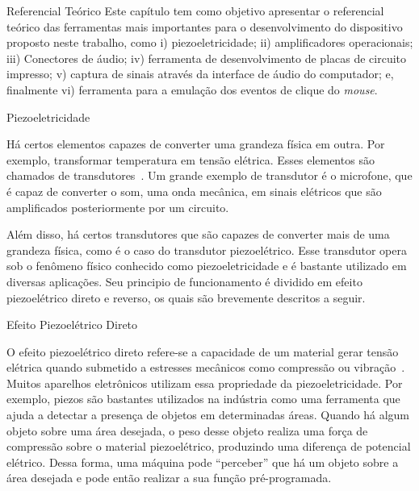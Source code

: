 \begin{chapter}{Referencial Teórico}
Este capítulo tem como objetivo apresentar o referencial teórico das ferramentas
mais importantes para o desenvolvimento do dispositivo proposto neste trabalho,
como i) piezoeletricidade; ii) amplificadores operacionais; iii) Conectores de
áudio; iv) ferramenta de desenvolvimento de placas de circuito impresso; v)
captura de sinais através da interface de áudio do computador; e, finalmente vi)
ferramenta para a emulação dos eventos de clique do \textit{mouse}.

\begin{section}{Piezoeletricidade}

Há certos elementos capazes de converter uma grandeza física em outra. Por
exemplo, transformar temperatura em tensão elétrica. Esses elementos são
chamados de transdutores~\cite{william}. Um grande exemplo de transdutor é o
microfone, que é capaz de converter o som, uma onda mecânica, em sinais
elétricos que são amplificados posteriormente por um circuito. %

Além disso, há certos transdutores que são capazes de converter mais de uma
grandeza física, como é o caso do transdutor piezoelétrico. Esse transdutor
opera sob o fenômeno físico conhecido como piezoeletricidade e é bastante
utilizado em diversas aplicações. Seu principio de funcionamento é dividido em
efeito piezoelétrico direto e reverso, os quais são brevemente descritos a
seguir.
  
\begin{subsection}{Efeito Piezoelétrico Direto}

O efeito piezoelétrico direto refere-se a capacidade de um material gerar tensão
elétrica quando submetido a estresses mecânicos como compressão ou
vibração~\cite{jaffe2012piezoelectric}. Muitos aparelhos eletrônicos utilizam
essa propriedade da piezoeletricidade. Por exemplo, piezos são bastantes
utilizados na indústria como uma ferramenta que ajuda a detectar a presença de
objetos em determinadas áreas. Quando há algum objeto sobre uma área desejada,
o peso desse objeto realiza uma força de compressão sobre o material
piezoelétrico, produzindo uma diferença de potencial elétrico. Dessa
forma, uma máquina pode ``perceber'' que há um objeto sobre a área desejada e
pode então realizar a sua função pré-programada. %
  

\end{subsection}
\end{section}
\end{chapter}
